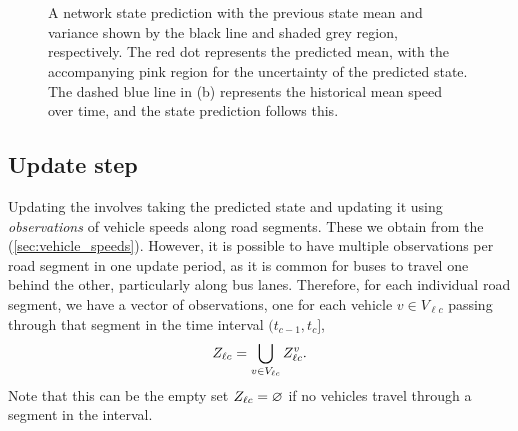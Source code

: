 \begin{knitrout}\small
{}\color{fgcolor}\begin{figure}

{\centering {}\\
\\

}

\caption[A network state prediction with the previous state mean and variance shown by the black line and shaded grey region, respectively]{A network state prediction with the previous state mean and variance shown by the black line and shaded grey region, respectively. The red dot represents the predicted mean, with the accompanying pink region for the uncertainty of the predicted state. The dashed blue line in (b) represents the historical mean speed over time, and the state prediction follows this.}\label{fig:nw_kf}
\end{figure}


\end{knitrout}


\subsection{Update step}
\label{sec:kf_update}

Updating the \kf{} involves taking the predicted state and updating it using \emph{observations} of vehicle speeds along road segments. These we obtain from the \pf{} (\cref{sec:vehicle_speeds}). However, it is possible to have multiple observations per road segment in one update period, as it is common for buses to travel one behind the other, particularly along bus lanes. Therefore, for each individual road segment, we have a vector of observations, one for each vehicle $v \in V_{\ell c}$ passing through that segment in the time interval $(t_{c-1}, t_c]$,
\begin{equation} \label{eq:nw_seg_obs}
Z_{\ell c} = \bigcup_{v\in V_{\ell c}} Z_{\ell c}^v.
\end{equation}
Note that this can be the empty set $Z_{\ell c} = \varnothing$ if no vehicles travel through a segment in the interval.


